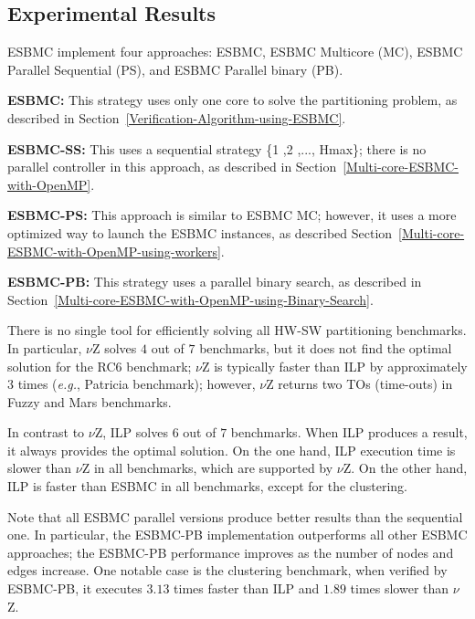 \subsection{Experimental Results}
\label{Experimental-Results}

ESBMC implement four approaches: ESBMC, ESBMC Multicore (MC), ESBMC Parallel Sequential (PS), and ESBMC Parallel binary (PB).

\begin{itemize}
\item{\textbf{ESBMC:} This strategy uses only one core to solve the partitioning problem, as described in Section~\ref{Verification-Algorithm-using-ESBMC}.
\item{\textbf{ESBMC-SS:} This uses a sequential strategy \{1 ,2 ,\:...\:, Hmax\}; there is no parallel controller in this approach, as described in Section~\ref{Multi-core-ESBMC-with-OpenMP}.}
\item{\textbf{ESBMC-PS:} This approach is similar to ESBMC MC; however, it uses a more optimized way to launch the ESBMC instances, as described Section~\ref{Multi-core-ESBMC-with-OpenMP-using-workers}.}
\item{\textbf{ESBMC-PB:} This strategy uses a parallel binary search, as described in Section~\ref{Multi-core-ESBMC-with-OpenMP-using-Binary-Search}.}}
\end{itemize}

There is no single tool for efficiently solving all HW-SW partitioning benchmarks. In particular, $\nu$Z solves $4$ out of $7$ benchmarks, but it does not find the optimal solution for the RC$6$ benchmark; $\nu$Z is typically faster than ILP by approximately $3$ times ({\it e.g.}, Patricia benchmark); however, $\nu$Z returns two TOs (time-outs) in Fuzzy and Mars benchmarks.

In contrast to $\nu$Z, ILP solves $6$ out of $7$ benchmarks. When ILP produces a result, it always provides the optimal solution. On the one hand, ILP execution time is slower than $\nu$Z in all benchmarks, which are supported by $\nu$Z. On the other hand, ILP is faster than ESBMC in all benchmarks, except for the clustering.

Note that all ESBMC parallel versions produce better results than the sequential one. In particular, the ESBMC-PB implementation outperforms all other ESBMC approaches; the ESBMC-PB performance improves as the number of nodes and edges increase. One notable case is the clustering benchmark, when verified by ESBMC-PB, it executes $3$.$13$ times faster than ILP and $1$.$89$ times slower than $\nu$Z.

